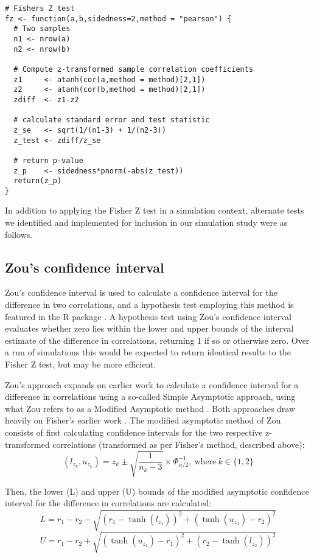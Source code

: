 \begin{lstlisting}[float=h,caption={Fisher's Z test (simulation approach)},label={lst:fz}]
# Fishers Z test
fz <- function(a,b,sidedness=2,method = "pearson") {
  # Two samples
  n1 <- nrow(a)
  n2 <- nrow(b)
   
  # Compute z-transformed sample correlation coefficients
  z1     <- atanh(cor(a,method = method)[2,1])
  z2     <- atanh(cor(b,method = method)[2,1])
  zdiff  <- z1-z2
  
  # calculate standard error and test statistic
  z_se   <- sqrt(1/(n1-3) + 1/(n2-3))
  z_test <- zdiff/z_se
  
  # return p-value
  z_p    <- sidedness*pnorm(-abs(z_test))
  return(z_p)
}
\end{lstlisting}


In addition to applying the Fisher Z test in a simulation context, alternate tests we identified and implemented for inclusion in our simulation study were as follows. 

\subsection{Zou's confidence interval}
Zou's confidence interval is used to calculate a confidence interval for the difference in two correlations, and a hypothesis test employing this method is featured in the R package  \cite{Zou2007,Diedenhofen2015}.  A hypothesis test using Zou's confidence interval evaluates whether zero lies within the lower and upper bounds of the interval estimate of the difference in correlations, returning 1 if so or otherwise zero.  Over a run of simulations this would be expected to return identical results to the Fisher Z test, but may be more efficient.

Zou's approach expands on earlier work \cite{Olkin1995} to calculate a confidence interval for a difference in correlations using a so-called Simple Asymptotic approach, using what Zou refers to as a Modified Asymptotic method \cite{Zou2007}.  Both approaches draw heavily on Fisher's earlier work \cite{Fisher1990}.  The modified asymptotic method of Zou consists of first calculating confidence intervals for the two respective z-transformed correlations (transformed as per Fisher's method, described above):
$$(l_z_k, u_z_k) = z_k \pm \sqrt{\frac{1}{n_k - 3}} \times \Phi_{\alpha/2}^{-1},\ \text{where} \ k \in \{1,2\}$$

Then, the lower (L) and upper (U) bounds of the modified asymptotic confidence interval for the difference in correlations are calculated:
$$L = r_1 - r_2 - \sqrt{(r_1 - \tanh(l_z_1))^2 + (\tanh(u_z_2)- r_2)^2}$$
$$U = r_1 - r_2 + \sqrt{(\tanh(u_z_1) - r_1)^2 + (r_2 - \tanh(l_z_2))^2}$$

